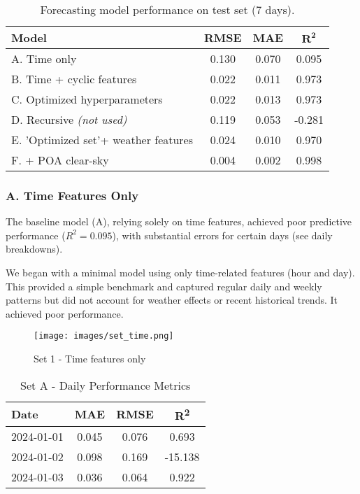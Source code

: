 \begin{table}[h!]
    \centering
    \begin{tabular}{lccc}
        \textbf{Model} & \textbf{RMSE} & \textbf{MAE} & $\mathbf{R^2}$ \\
        \hline
        A. Time only & 0.130 & 0.070 & 0.095 \\
        B. Time + cyclic features & 0.022 & 0.011 & 0.973 \\
        C. Optimized hyperparameters & 0.022 & 0.013 & 0.973 \\
        D. Recursive \textit{(not used)} & 0.119 & 0.053 & -0.281 \\
        E. 'Optimized set'+ weather features & 0.024 & 0.010 & 0.970 \\
        F. + POA clear-sky & 0.004 & 0.002 & 0.998 \\
    \end{tabular}
    \caption{Forecasting model performance on test set (7 days).}
    \label{tab:forecast-metrics}
\end{table}

\subsubsection*{A. Time Features Only}
The baseline model (A), relying solely on time features, achieved poor predictive performance ($R^2=0.095$), 
with substantial errors for certain days (see daily breakdowns). 

We began with a minimal model using only time-related features (hour and day). This 
provided a simple benchmark and captured regular daily and weekly patterns but did not 
account for weather effects or recent historical trends. It achieved poor performance. 

\begin{figure}[H]
    \centering
    \texttt{[image: images/set\_time.png]}
    \caption{Set 1 - Time features only}
    \label{fig:set1-forecast-profile}
\end{figure}

\begin{table}[H]
    \centering
    \begin{tabular}{lccc}
        Date        & MAE    & RMSE   & R\textsuperscript{2} \\
        \hline
        2024-01-01  & 0.045  & 0.076  & 0.693 \\
        2024-01-02  & 0.098  & 0.169  & -15.138 \\
        2024-01-03  & 0.036  & 0.064  & 0.922 \\
    \end{tabular}
    \caption{Set A - Daily Performance Metrics}
\end{table}

